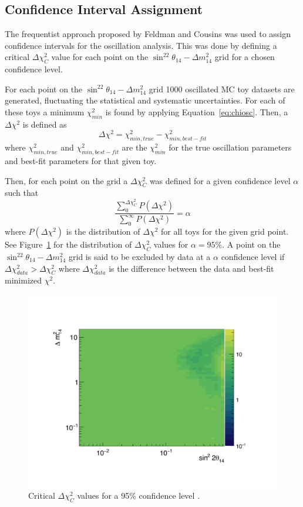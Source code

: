 \subsection{Confidence Interval Assignment}

The frequentist approach proposed by Feldman and Cousins \cite{PhysRevD.57.3873} was used to assign confidence intervals for the oscillation analysis.
This was done by defining a critical $\Delta\chi^2_C$ value for each point on the $\sin^22\theta_{14}-\Delta m^2_{14}$ grid for a chosen confidence level.

For each point on the $\sin^22\theta_{14}-\Delta m^2_{14}$ grid 1000 oscillated MC toy datasets are generated, fluctuating the statistical and systematic uncertainties.
For each of these toys a minimum $\chi^2_{min}$ is found by applying Equation~\ref{eq:chiosc}.
Then, a $\Delta\chi^2$ is defined as
\begin{equation}
	\Delta\chi^2 = \chi^2_{min,true} - \chi^2_{min,best-fit}
\end{equation}
where $\chi^2_{min,true}$ and $\chi^2_{min,best-fit}$ are the $\chi^2_{min}$ for the true oscillation parameters and best-fit parameters for that given toy.

Then, for each point on the grid a $\Delta\chi^2_C$ was defined for a given confidence level $\alpha$ such that
\begin{equation}
	\frac{\sum_{0}^{\Delta\chi^2_C}P(\Delta\chi^2)}{\sum_{0}^{\infty}P(\Delta\chi^2)} = \alpha
\end{equation}
where $P(\Delta\chi^2)$ is the distribution of $\Delta\chi^2$ for all toys for the given grid point.
See Figure~\ref{fig:chi2map} for the distribution of $\Delta\chi^2_C$ values for $\alpha = 95\%$.
A point on the $\sin^22\theta_{14}-\Delta m^2_{14}$ grid is said to be excluded by data at a $\alpha$ confidence level if $\Delta\chi^2_{data} > \Delta\chi^2_{C}$ where $\Delta\chi^2_{data}$ is the difference between the data and best-fit minimized $\chi^2$.


\begin{figure}[h]
	\centering
	\includegraphics[width=0.7\linewidth]{tex/7-oscillation-images/Chi2Map}
	\caption[]{Critical $\Delta\chi^2_C$ values for a 95\% confidence level \cite{SurukuchiThesis}.}
	\label{fig:chi2map}
\end{figure}



